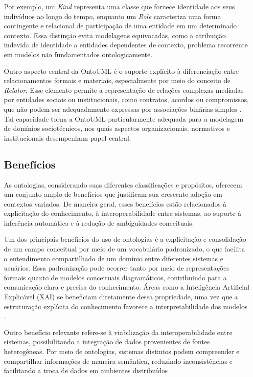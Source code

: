 Por exemplo, um \textit{Kind} representa uma classe que fornece identidade aos seus indivíduos ao longo do tempo, enquanto um \textit{Role} caracteriza uma forma contingente e relacional de participação de uma entidade em um determinado contexto. Essa distinção evita modelagens equivocadas, como a atribuição indevida de identidade a entidades dependentes de contexto, problema recorrente em modelos não fundamentados ontologicamente.

Outro aspecto central da OntoUML é o suporte explícito à diferenciação entre relacionamentos formais e materiais, especialmente por meio do conceito de \textit{Relator}. Esse elemento permite a representação de relações complexas mediadas por entidades sociais ou institucionais, como contratos, acordos ou compromissos, que não podem ser adequadamente expressas por associações binárias simples \cite{ontouml_readthedocs}. Tal capacidade torna a OntoUML particularmente adequada para a modelagem de domínios sociotécnicos, nos quais aspectos organizacionais, normativos e institucionais desempenham papel central.

\subsection{Benefícios}
As ontologias, considerando suas diferentes classificações e propósitos, oferecem um conjunto amplo de benefícios que justificam sua crescente adoção em contextos variados. De maneira geral, esses benefícios estão relacionados à explicitação do conhecimento, à interoperabilidade entre sistemas, ao suporte à inferência automática e à redução de ambiguidades conceituais.

Um dos principais benefícios do uso de ontologias é a explicitação e consolidação de um campo conceitual por meio de um vocabulário padronizado, o que facilita o entendimento compartilhado de um domínio entre diferentes sistemas e usuários. Essa padronização pode ocorrer tanto por meio de representações formais quanto de modelos conceituais diagramáticos, contribuindo para a comunicação clara e precisa do conhecimento. Áreas como a Inteligência Artificial Explicável (XAI) se beneficiam diretamente dessa propriedade, uma vez que a estruturação explícita do conhecimento favorece a interpretabilidade dos modelos \cite{confalonieri2023multiple}.

Outro benefício relevante refere-se à viabilização da interoperabilidade entre sistemas, possibilitando a integração de dados provenientes de fontes heterogêneas. Por meio de ontologias, sistemas distintos podem compreender e compartilhar informações de maneira semântica, reduzindo inconsistências e facilitando a troca de dados em ambientes distribuídos \cite{gonccalves2011using}.


